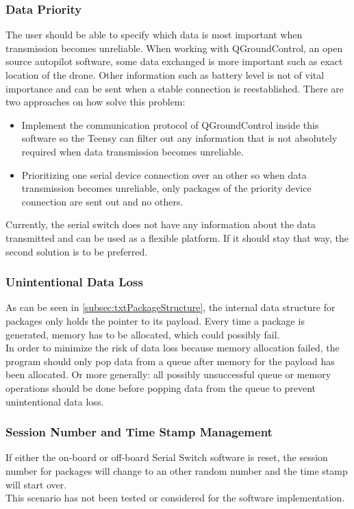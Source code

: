\subsubsection{Data Priority}
The user should be able to specify which data is most important when transmission becomes unreliable. When working with QGroundControl, an open source autopilot software, some data exchanged is more important such as exact location of the drone. Other information such as battery level is not of vital importance and can be sent when a stable connection is reestablished. There are two approaches on how solve this problem:
\begin{itemize}
    \item Implement the communication protocol of QGroundControl inside this software so the Teensy can filter out any information that is not absolutely required when data transmission becomes unreliable.
    \item Prioritizing one serial device connection over an other so when data transmission becomes unreliable, only packages of the priority device connection are sent out and no others.
\end{itemize}
Currently, the serial switch does not have any information about the data transmitted and can be used as a flexible platform. If it should stay that way, the second solution is to be preferred.
%
\subsubsection{Unintentional Data Loss}
As can be seen in \autoref{subsec:txtPackageStructure}, the internal data structure for packages only holds the pointer to its payload. Every time a package is generated, memory has to be allocated, which could possibly fail.\\
In order to minimize the risk of data loss because memory allocation failed, the program should only pop data from a queue after memory for the payload has been allocated. Or more generally: all possibly unsuccessful queue or memory operations should be done before popping data from the queue to prevent unintentional data loss.
%
\subsubsection{Session Number and Time Stamp Management}
If either the on-board or off-board Serial Switch software is reset, the session number for packages will change to an other random number and the time stamp will start over.\\
This scenario has not been tested or considered for the software implementation.\\
%
